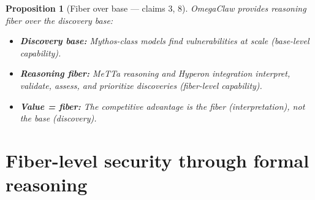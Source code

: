 \documentclass[11pt,a4paper]{article}
\newtheorem{proposition}[definition]{Proposition}
\begin{document}
\begin{proposition}[Fiber over base --- claims 3, 8]
\label{prop:omegaclaw}
OmegaClaw provides reasoning fiber over the discovery base:
\begin{itemize}
  \item \textbf{Discovery base:} Mythos-class models find vulnerabilities
    at scale (base-level capability).
  \item \textbf{Reasoning fiber:} MeTTa reasoning and Hyperon integration
    interpret, validate, assess, and prioritize discoveries (fiber-level
    capability).
  \item \textbf{Value = fiber:} The competitive advantage is the fiber
    (interpretation), not the base (discovery).
\end{itemize}
\end{proposition}


\section{Fiber-level security through formal reasoning}
\label{sec:formal}
\end{document}
